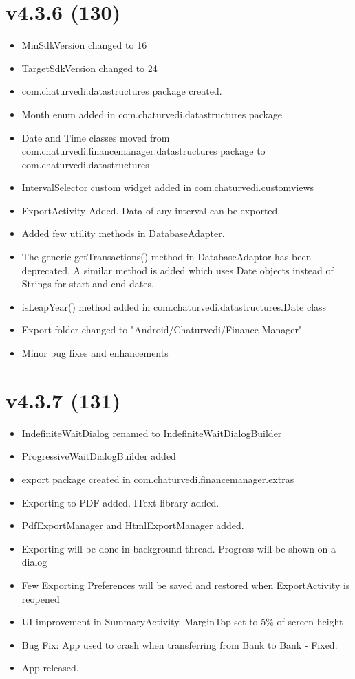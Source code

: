 \documentclass{article}
\begin{document}
    \section{v4.3.6 (130)}\label{sec:130}
    \begin{itemize}
        \item MinSdkVersion changed to 16
        \item TargetSdkVersion changed to 24
        \item com.chaturvedi.datastructures package created.
        \item Month enum added in com.chaturvedi.datastructures package
        \item Date and Time classes moved from com.chaturvedi.financemanager.datastructures package to com.chaturvedi.datastructures
        \item IntervalSelector custom widget added in com.chaturvedi.customviews
        \item ExportActivity Added.
        Data of any interval can be exported.
        \item Added few utility methods in DatabaseAdapter.
        \item The generic getTransactions() method in DatabaseAdaptor has been deprecated.
        A similar method is added which uses Date objects instead of Strings for start and end dates.
        \item isLeapYear() method added in com.chaturvedi.datastructures.Date class
        \item Export folder changed to "Android/Chaturvedi/Finance Manager"
        \item Minor bug fixes and enhancements
    \end{itemize}

    \section{v4.3.7 (131)}\label{sec:131}
    \begin{itemize}
        \item IndefiniteWaitDialog renamed to IndefiniteWaitDialogBuilder
        \item ProgressiveWaitDialogBuilder added
        \item export package created in com.chaturvedi.financemanager.extras
        \item Exporting to PDF added.
        IText library added.
        \item PdfExportManager and HtmlExportManager added.
        \item Exporting will be done in background thread.
        Progress will be shown on a dialog
        \item Few Exporting Preferences will be saved and restored when ExportActivity is reopened
        \item UI improvement in SummaryActivity.
        MarginTop set to 5\% of screen height
        \item Bug Fix: App used to crash when transferring from Bank to Bank - Fixed.
        \item App released.
    \end{itemize}
\end{document}
